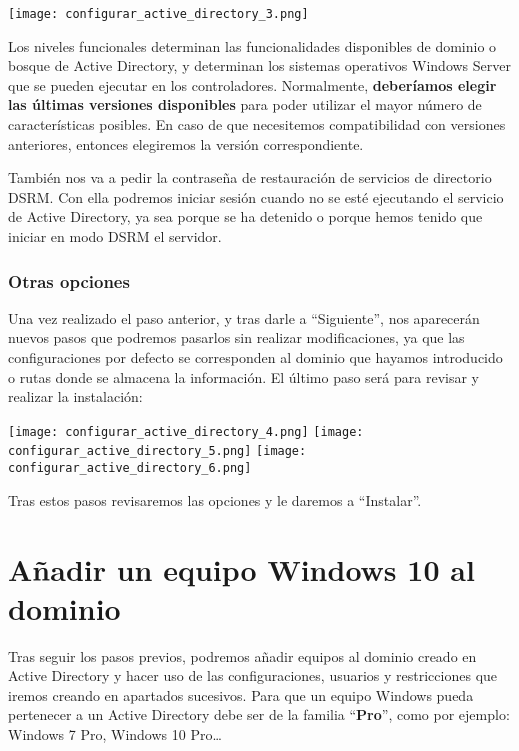 \begin{center}
    \vspace{-15pt}
    \texttt{[image: configurar\_active\_directory\_3.png]}
    \vspace{-15pt}
\end{center}

Los niveles funcionales determinan las funcionalidades disponibles de dominio o bosque de Active Directory, y determinan los sistemas operativos Windows Server que se pueden ejecutar en los controladores. Normalmente, \textbf{deberíamos elegir las últimas versiones disponibles} para poder utilizar el mayor número de características posibles. En caso de que necesitemos compatibilidad con  versiones anteriores, entonces elegiremos la versión correspondiente.

También nos va a pedir la contraseña de restauración de servicios de directorio DSRM. Con ella podremos iniciar sesión cuando no se esté ejecutando el servicio de Active Directory, ya sea porque se ha detenido o porque hemos tenido que iniciar en modo DSRM el servidor.


\subsection{Otras opciones}
Una vez realizado el paso anterior, y tras darle a “Siguiente”, nos aparecerán nuevos pasos que podremos pasarlos sin realizar modificaciones, ya que las configuraciones por defecto se corresponden al dominio que hayamos introducido o rutas donde se almacena la información. El último paso será para revisar y realizar la instalación:

\begin{center}
    \vspace{-15pt}
    \texttt{[image: configurar\_active\_directory\_4.png]}
    \hfill
    \texttt{[image: configurar\_active\_directory\_5.png]}
    \hfill
    \texttt{[image: configurar\_active\_directory\_6.png]}
    \vspace{-15pt}
\end{center}

Tras estos pasos revisaremos las opciones y le daremos a “Instalar”.

\chapter{Añadir un equipo Windows 10 al dominio}
Tras seguir los pasos previos, podremos añadir equipos al dominio creado en Active Directory y hacer uso de las configuraciones, usuarios y restricciones que iremos creando en apartados sucesivos. Para que un equipo Windows pueda pertenecer a un Active Directory debe ser de la familia “\textbf{Pro}”, como por ejemplo: Windows 7 Pro, Windows 10 Pro…

